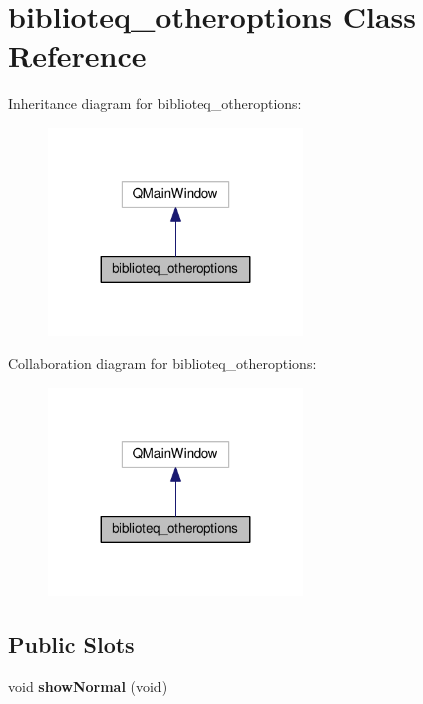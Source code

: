 \hypertarget{classbiblioteq__otheroptions}{}\section{biblioteq\+\_\+otheroptions Class Reference}
\label{classbiblioteq__otheroptions}


Inheritance diagram for biblioteq\+\_\+otheroptions\+:
\nopagebreak
\begin{figure}[H]
\begin{center}
\leavevmode
\includegraphics[width=191pt]{classbiblioteq__otheroptions__inherit__graph}
\end{center}
\end{figure}


Collaboration diagram for biblioteq\+\_\+otheroptions\+:
\nopagebreak
\begin{figure}[H]
\begin{center}
\leavevmode
\includegraphics[width=191pt]{classbiblioteq__otheroptions__coll__graph}
\end{center}
\end{figure}
\subsection*{Public Slots}
\begin{DoxyCompactItemize}
\item 
void {\bfseries show\+Normal} (void)\hypertarget{classbiblioteq__otheroptions_a966f360ab5afef4eb7778212ae509384}{}\label{classbiblioteq__otheroptions_a966f360ab5afef4eb7778212ae509384}

\end{DoxyCompactItemize}
